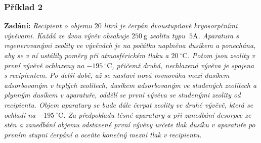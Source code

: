 \documentclass[english]{article}
\newcommand{\unit}[1]{~\mathrm{#1}}
\begin{document}
\clearpage
\subsubsection{Příklad 2}
\textbf{Zadání:} \emph{Recipient o objemu $20$ litrů je čerpán dvoustupňově kryosorpčními vývěvami. Každá ze dvou vývěv obsahuje $250\unit{g}$ zeolitu typu $\unit{5A}$. Aparatura s regenerovanými zeolity ve vývěvách je na počátku naplněna dusíkem a ponechána, aby se v ní ustálily poměry při atmosférickém tlaku a $20\unit{^\circ C}$. Potom jsou zeolity v první vývěvě ochlazeny na  $ -195\unit{^\circ C}$, přičemž druhá, nechlazená vývěva je spojena s recipientem. Po delší době, až se nastaví nová rovnováha mezi dusíkem adsorbovaným v teplých zeolitech, dusíkem adsorbovaným ve studených zeolitech a plynným dusíkem v aparatuře, oddělí se první vývěva se studenými
zeolity od recipientu. Objem aparatury se bude dále čerpat zeolity ve druhé vývěvě, která se ochladí na  $ -195\unit{^\circ C}$. Za předpokladu těsné aparatury a při zanedbání desorpce ze stěn a zanedbání objemu odstavené první vývěvy určete tlak dusíku v aparatuře po prvním stupni čerpání a oceňte konečný mezní tlak v recipientu.}
\end{document}
